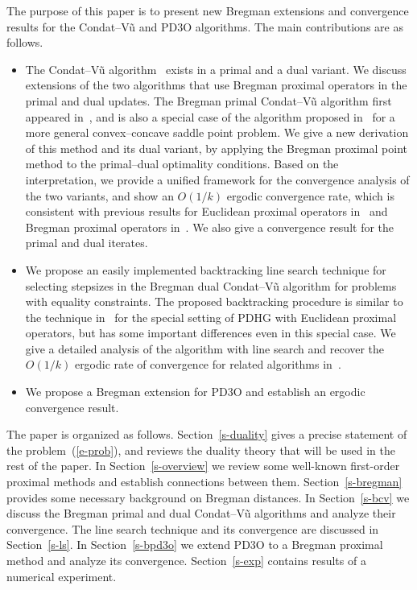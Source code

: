 \documentclass[letterpaper,11pt]{article}
\begin{document}
The purpose of this paper is to present new Bregman extensions and
convergence results for the Condat--V\~u and PD3O algorithms.
The main contributions are as follows.
\begin{itemize}
\item The Condat--V\~u algorithm~\cite{Con:13,Vu:13} exists in a primal
and a dual variant.
We discuss extensions of the two algorithms
that use Bregman proximal operators in the primal and dual updates.
The Bregman primal Condat--V\~u algorithm first appeared
in~\cite[Algorithm 1]{ChP:16}, and is also a special case 
of the algorithm proposed in~\cite{YHA21}
for a more general convex--concave saddle point problem.
We give a new derivation of this method and its dual variant,
by applying the Bregman proximal point method
to the primal--dual optimality conditions.
Based on the interpretation, we provide a unified framework
for the convergence analysis of the two variants,
and show an $O(1/k)$ ergodic convergence rate,
which is consistent with previous results for Euclidean proximal operators
in~\cite{Con:13,Vu:13} and Bregman proximal operators in~\cite{ChP:16}.
We also give a convergence result for the primal and dual iterates. 

\item We propose an easily implemented backtracking line search technique 
for selecting stepsizes in the Bregman dual Condat--V\~u
algorithm for problems with equality constraints.
The proposed backtracking procedure is similar to the technique
in~\cite{MaP:18} for the special setting of PDHG with Euclidean proximal 
operators, but has some important differences even in this special case.
We give a detailed analysis of the algorithm
with line search and recover the $O(1/k)$ ergodic rate of convergence
for related algorithms in~\cite{MaP:18,JV22}.

\item We propose a Bregman extension for PD3O
and establish an ergodic convergence result.
\end{itemize}
The paper is organized as follows.
Section~\ref{s-duality} gives a precise statement of the 
problem~(\ref{e-prob}), and reviews the duality theory
that will be used in the rest of the paper. 
In Section~\ref{s-overview} we review some well-known first-order
proximal methods and establish connections between them.
Section~\ref{s-bregman} provides some necessary background on 
Bregman distances.
In Section~\ref{s-bcv} we discuss the Bregman primal and dual 
Condat--V\~u algorithms
and analyze their convergence.
The line search technique and its convergence are discussed
in Section~\ref{s-ls}.
In Section~\ref{s-bpd3o} we extend PD3O to a Bregman proximal method
and analyze its convergence.
Section~\ref{s-exp} contains results of a numerical experiment.
\end{document}
